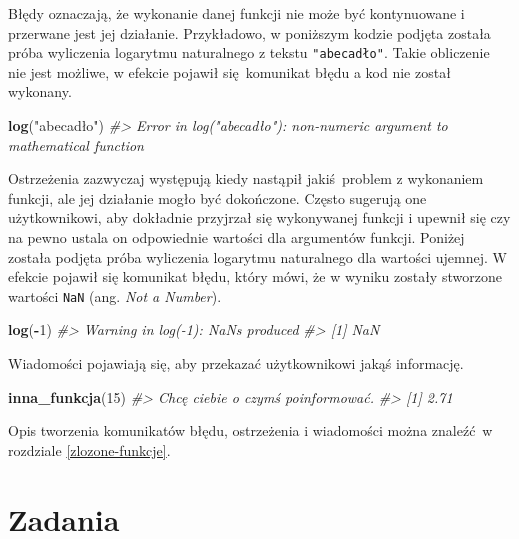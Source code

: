 \documentclass[paper=6in:9in,pagesize=pdftex,headinclude=on,footinclude=on,10pt]{scrbook}
\newenvironment{Shaded}{\begin{snugshade}}{\end{snugshade}}
\newcommand{\CommentTok}[1]{\textcolor[rgb]{0.56,0.35,0.01}{\textit{#1}}}
\newcommand{\DecValTok}[1]{\textcolor[rgb]{0.00,0.00,0.81}{#1}}
\newcommand{\KeywordTok}[1]{\textcolor[rgb]{0.13,0.29,0.53}{\textbf{#1}}}
\newcommand{\NormalTok}[1]{#1}
\newcommand{\OperatorTok}[1]{\textcolor[rgb]{0.81,0.36,0.00}{\textbf{#1}}}
\newcommand{\StringTok}[1]{\textcolor[rgb]{0.31,0.60,0.02}{#1}}
\begin{document}
Błędy oznaczają, że wykonanie danej funkcji nie może być kontynuowane i przerwane jest jej działanie.
Przykładowo, w poniższym kodzie podjęta została próba wyliczenia logarytmu naturalnego z tekstu \texttt{"abecadło"}.
Takie obliczenie nie jest możliwe, w efekcie pojawił się~komunikat błędu a kod nie został wykonany.

\begin{Shaded}
\begin{Highlighting}[]
\KeywordTok{log}\NormalTok{(}\StringTok{"abecadło"}\NormalTok{)}
\CommentTok{#> Error in log("abecadło"): non-numeric argument to mathematical function}
\end{Highlighting}
\end{Shaded}

Ostrzeżenia zazwyczaj występują kiedy nastąpił jakiś~problem z wykonaniem funkcji, ale jej działanie mogło być dokończone.
Często sugerują one użytkownikowi, aby dokładnie przyjrzał się wykonywanej funkcji i upewnił się czy na pewno ustala on odpowiednie wartości dla argumentów funkcji.
Poniżej została podjęta próba wyliczenia logarytmu naturalnego dla wartości ujemnej.
W efekcie pojawił się komunikat błędu, który mówi, że w wyniku zostały stworzone wartości \texttt{NaN} (ang. \emph{Not a Number}).

\begin{Shaded}
\begin{Highlighting}[]
\KeywordTok{log}\NormalTok{(}\OperatorTok{-}\DecValTok{1}\NormalTok{)}
\CommentTok{#> Warning in log(-1): NaNs produced}
\CommentTok{#> [1] NaN}
\end{Highlighting}
\end{Shaded}

Wiadomości pojawiają się, aby przekazać użytkownikowi jakąś informację.

\begin{Shaded}
\begin{Highlighting}[]
\KeywordTok{inna_funkcja}\NormalTok{(}\DecValTok{15}\NormalTok{)}
\CommentTok{#> Chcę ciebie o czymś poinformować.}
\CommentTok{#> [1] 2.71}
\end{Highlighting}
\end{Shaded}

Opis tworzenia komunikatów błędu, ostrzeżenia i wiadomości można znaleźć~w rozdziale \ref{zlozone-funkcje}.

\hypertarget{zadania}{%
\section{Zadania}\label{zadania}}
\end{document}
